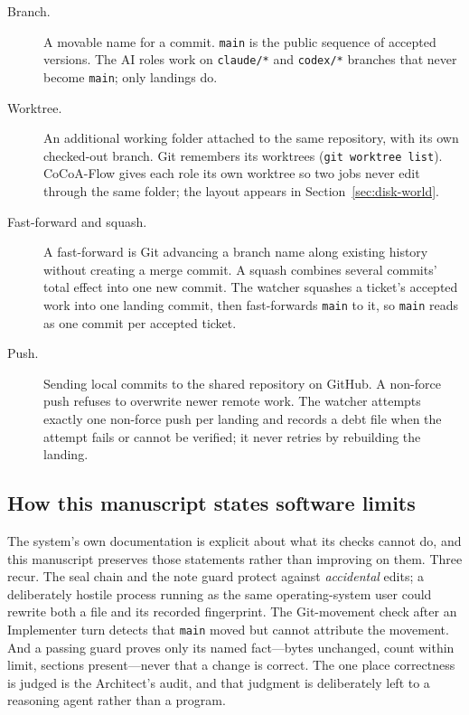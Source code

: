 \documentclass[10pt,aps,prd,twocolumn,nofootinbib]{revtex4-2}
\newcommand{\code}[1]{\texttt{#1}}
\begin{document}
\begin{description}
  \item[Branch.]  A movable name for a commit.  \code{main} is the
  public sequence of accepted versions.  The AI roles work on
  \code{claude/*} and \code{codex/*} branches that never become
  \code{main}; only landings do.

  \item[Worktree.]  An additional working folder attached to the same
  repository, with its own checked-out branch.  Git remembers its
  worktrees (\code{git worktree list}).  CoCoA-Flow gives each role its
  own worktree so two jobs never edit through the same folder; the
  layout appears in Section~\ref{sec:disk-world}.

  \item[Fast-forward and squash.]  A fast-forward is Git advancing a
  branch name along existing history without creating a merge commit.
  A squash combines several commits' total effect into one new commit.
  The watcher squashes a ticket's accepted work into one landing
  commit, then fast-forwards \code{main} to it, so \code{main} reads as
  one commit per accepted ticket.

  \item[Push.]  Sending local commits to the shared repository on
  GitHub.  A non-force push refuses to overwrite newer remote work.
  The watcher attempts exactly one non-force push per landing and
  records a debt file when the attempt fails or cannot be verified; it
  never retries by rebuilding the landing.
\end{description}

\subsection{How this manuscript states software limits}
\label{sec:limits-style}

The system's own documentation is explicit about what its checks cannot
do, and this manuscript preserves those statements rather than
improving on them.  Three recur.  The seal chain and the note guard
protect against \emph{accidental} edits; a deliberately hostile process
running as the same operating-system user could rewrite both a file and
its recorded fingerprint.  The Git-movement check after an Implementer
turn detects that \code{main} moved but cannot attribute the movement.
And a passing guard proves only its named fact---bytes unchanged, count
within limit, sections present---never that a change is correct.  The
one place correctness is judged is the Architect's audit, and that
judgment is deliberately left to a reasoning agent rather than a
program.
\end{document}
